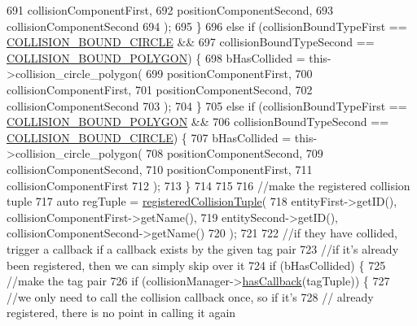 \begin{DoxyCode}
691                     collisionComponentFirst,
692                     positionComponentSecond,
693                     collisionComponentSecond
694                     );
695             \}
696             \textcolor{keywordflow}{else} \textcolor{keywordflow}{if} (collisionBoundTypeFirst == \hyperlink{_a_e___attributes_8h_a50b28a4aee049371f130f3eafa9c942f}{COLLISION\_BOUND\_CIRCLE} &&
697                 collisionBoundTypeSecond == \hyperlink{_a_e___attributes_8h_a71ab491ab7b44947b07d7b05974387d9}{COLLISION\_BOUND\_POLYGON}) \{
698                 bHasCollided = this->collision\_circle\_polygon(
699                     positionComponentFirst,
700                     collisionComponentFirst,
701                     positionComponentSecond,
702                     collisionComponentSecond
703                     );
704             \}
705             \textcolor{keywordflow}{else} \textcolor{keywordflow}{if} (collisionBoundTypeFirst == \hyperlink{_a_e___attributes_8h_a71ab491ab7b44947b07d7b05974387d9}{COLLISION\_BOUND\_POLYGON} &&
706                 collisionBoundTypeSecond == \hyperlink{_a_e___attributes_8h_a50b28a4aee049371f130f3eafa9c942f}{COLLISION\_BOUND\_CIRCLE}) \{
707                 bHasCollided = this->collision\_circle\_polygon(
708                     positionComponentSecond,
709                     collisionComponentSecond,
710                     positionComponentFirst,
711                     collisionComponentFirst
712                     );
713             \}
714 
715 
716             \textcolor{comment}{//make the registered collision tuple}
717             \textcolor{keyword}{auto} regTuple = \hyperlink{_collision_manager_8h_ada58768e1593bf8b68e443116782f54e}{registeredCollisionTuple}(
718                 entityFirst->getID(), collisionComponentFirst->getName(),
719                 entitySecond->getID(), collisionComponentSecond->getName()
720                 );
721 
722             \textcolor{comment}{//if they have collided, trigger a callback if a callback exists by the given tag pair}
723             \textcolor{comment}{//if it's already been registered, then we can simply skip over it}
724             \textcolor{keywordflow}{if} (bHasCollided) \{
725                 \textcolor{comment}{//make the tag pair}
726                 \textcolor{keywordflow}{if} (collisionManager->\hyperlink{class_collision_manager_a98395760494f7976f75c1d50072dcc5a}{hasCallback}(tagTuple)) \{
727                     \textcolor{comment}{//we only need to call the collision callback once, so if it's}
728                     \textcolor{comment}{// already registered, there is no point in calling it again}

\end{DoxyCode}
